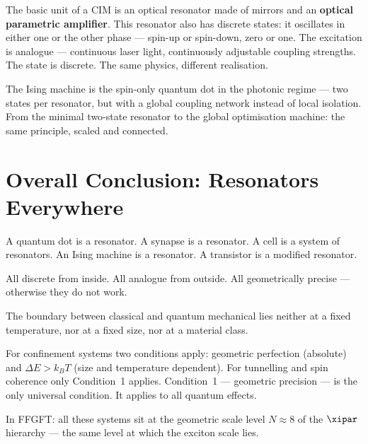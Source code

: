 The basic unit of a CIM is an optical resonator
made of mirrors and an \textbf{optical parametric amplifier}.
This resonator also has discrete states:
it oscillates in either one or the other phase ---
spin-up or spin-down, zero or one.
The excitation is analogue --- continuous laser light,
continuously adjustable coupling strengths.
The state is discrete. The same physics, different realisation.

\begin{center}
\end{center}

The Ising machine is the spin-only quantum dot in the photonic
regime --- two states per resonator, but with a global
coupling network instead of local isolation.
From the minimal two-state resonator to the global
optimisation machine: the same principle, scaled and connected.

\section{Overall Conclusion: Resonators Everywhere}
\label{sec:conclusion}

\begin{conclusionBox}[Conclusion]
A quantum dot is a resonator.
A synapse is a resonator.
A cell is a system of resonators.
An Ising machine is a resonator.
A transistor is a modified resonator.

All discrete from inside. All analogue from outside.
All geometrically precise --- otherwise they do not work.

The boundary between classical and quantum mechanical lies
neither at a fixed temperature, nor at a fixed size,
nor at a material class.

For confinement systems two conditions apply:
geometric perfection (absolute) and $\Delta E > k_BT$
(size and temperature dependent).
For tunnelling and spin coherence only Condition~1 applies.
Condition~1 --- geometric precision --- is the only
universal condition. It applies to all quantum effects.

In FFGFT: all these systems sit at the geometric
scale level $N \approx 8$ of the $\xipar$ hierarchy ---
the same level at which the exciton scale lies.
\end{conclusionBox}

